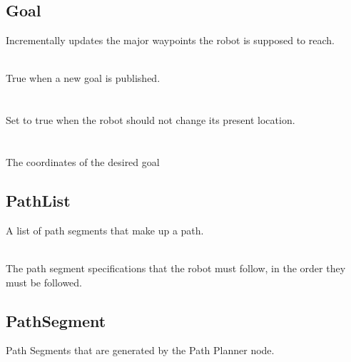 \subsection{Goal}
Incrementally updates the major waypoints the robot is supposed to reach.

\\
\indent True when a new goal is published.\\
\\
\\
\indent Set to true when the robot should not change its present location.\\
\\
\\
\indent The coordinates of the desired goal\\

\subsection{PathList}
A list of path segments that make up a path.

\\
\indent The path segment specifications that the robot must follow, in the order they must be followed.\\

\subsection{PathSegment}
Path Segments that are generated by the Path Planner node.

